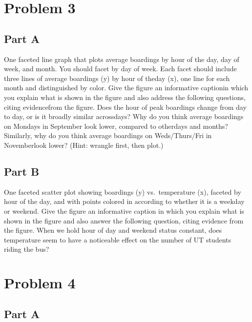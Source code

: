 \documentclass[
]{article}
\begin{document}
\hypertarget{problem-3}{%
\section{Problem 3}\label{problem-3}}

\hypertarget{part-a}{%
\subsection{Part A}\label{part-a}}

One faceted line graph that plots average boardings by hour of the day,
day of week, and month. You should facet by day of week. Each facet
should include three lines of average boardings (y) by hour of theday
(x), one line for each month and distinguished by color. Give the figure
an informative captionin which you explain what is shown in the figure
and also address the following questions, citing evidencefrom the
figure. Does the hour of peak boardings change from day to day, or is it
broadly similar acrossdays? Why do you think average boardings on
Mondays in September look lower, compared to otherdays and months?
Similarly, why do you think average boardings on Weds/Thurs/Fri in
Novemberlook lower? (Hint: wrangle first, then plot.)

\hypertarget{part-b}{%
\subsection{Part B}\label{part-b}}

One faceted scatter plot showing boardings (y) vs.~temperature (x),
faceted by hour of the day, and with points colored in according to
whether it is a weekday or weekend. Give the figure an informative
caption in which you explain what is shown in the figure and also answer
the following question, citing evidence from the figure. When we hold
hour of day and weekend status constant, does temperature seem to have a
noticeable effect on the number of UT students riding the bus?

\hypertarget{problem-4}{%
\section{Problem 4}\label{problem-4}}

\hypertarget{part-a-1}{%
\subsection{Part A}\label{part-a-1}}
\end{document}
